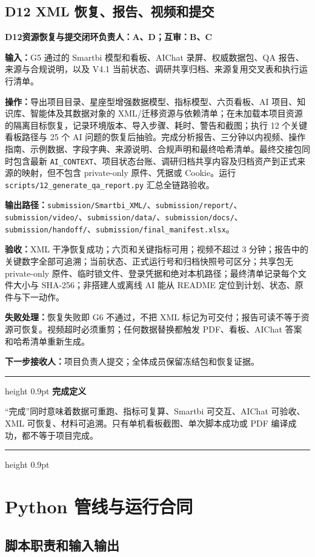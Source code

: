 \documentclass[UTF8,fontset=windows,12pt,openany]{ctexbook}
\newenvironment{gatebox}[1][]{%
  \par\medskip\noindent\begin{center}\begin{minipage}{0.93\textwidth}%
  \color{GoldLine}\hrule height 0.9pt\vspace{0.45em}%
  \textbf{#1}\par\smallskip\color{black}%
}{%
  \par\vspace{0.35em}\color{GoldLine}\hrule height 0.9pt%
  \end{minipage}\end{center}\medskip%
}
\newcommand{\Field}[1]{{\small\nolinkurl{#1}}}
\newcommand{\File}[1]{{\small\begingroup\urlstyle{same}\nolinkurl{#1}\endgroup}}
\newcommand{\StepTitle}[3]{%
  \noindent\colorbox{DeepNavy}{\parbox{0.965\textwidth}{\color{white}\Large\bfseries #1\quad #2\hfill\normalsize #3}}\par\medskip
}
\newcommand{\CardRow}[2]{\noindent\textbf{#1：}#2\par}
\begin{document}
\newpage
\section{D12 XML 恢复、报告、视频和提交}
\StepTitle{D12}{资源恢复与提交闭环}{负责人：A、D；互审：B、C}
\CardRow{输入}{G5 通过的 Smartbi 模型和看板、AIChat 录屏、权威数据包、QA 报告、来源与合规说明，以及 V4.1 当前状态、调研共享归档、来源复用交叉表和执行运行清单。}
\CardRow{操作}{导出项目目录、星座型增强数据模型、指标模型、六页看板、AI 项目、知识库、智能体及其数据对象的 XML/迁移资源与依赖清单；在未加载本项目资源的隔离目标恢复，记录环境版本、导入步骤、耗时、警告和截图；执行 12 个关键看板路径与 25 个 AI 问题的恢复后抽验。完成分析报告、三分钟以内视频、操作指南、示例数据、字段字典、来源说明、合规声明和最终哈希清单。最终交接包同时包含最新 \Field{AI_CONTEXT}、项目状态台账、调研归档共享内容及归档资产到正式来源的映射，但不包含 private-only 原件、凭据或 Cookie。运行 \File{scripts/12_generate_qa_report.py} 汇总全链路验收。}
\CardRow{输出路径}{\File{submission/Smartbi_XML/}、\File{submission/report/}、\File{submission/video/}、\File{submission/data/}、\File{submission/docs/}、\File{submission/handoff/}、\File{submission/final_manifest.xlsx}。}
\CardRow{验收}{XML 干净恢复成功；六页和关键指标可用；视频不超过 3 分钟；报告中的关键数字全部可追溯；当前状态、正式运行号和归档快照号可区分；共享包无 private-only 原件、临时锁文件、登录凭据和绝对本机路径；最终清单记录每个文件大小与 SHA-256；非搭建人或离线 AI 能从 README 定位到计划、状态、原件与下一动作。}
\CardRow{失败处理}{恢复失败即 G6 不通过，不把 XML 标记为可交付；报告可读不等于资源可恢复。视频超时必须重剪；任何数据替换都触发 PDF、看板、AIChat 答案和哈希清单重新生成。}
\CardRow{下一步接收人}{项目负责人提交；全体成员保留冻结包和恢复证据。}

\begin{gatebox}[完成定义]
“完成”同时意味着数据可重跑、指标可复算、Smartbi 可交互、AIChat 可验收、XML 可恢复、材料可追溯。只有单机看板截图、单次脚本成功或 PDF 编译成功，都不等于项目完成。
\end{gatebox}

\chapter{Python 管线与运行合同}

\section{脚本职责和输入输出}
\end{document}
